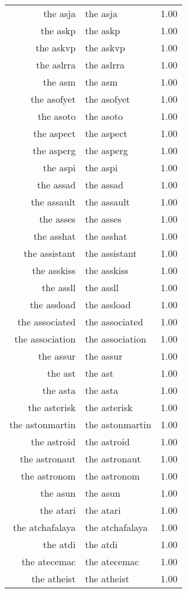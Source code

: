 \begin{table}[ht]
\begin{tabular}{rlr}
  the asja & the asja & 1.00 \\ 
  the askp & the askp & 1.00 \\ 
  the askvp & the askvp & 1.00 \\ 
  the aslrra & the aslrra & 1.00 \\ 
  the asm & the asm & 1.00 \\ 
  the asofyet & the asofyet & 1.00 \\ 
  the asoto & the asoto & 1.00 \\ 
  the aspect & the aspect & 1.00 \\ 
  the asperg & the asperg & 1.00 \\ 
  the aspi & the aspi & 1.00 \\ 
  the assad & the assad & 1.00 \\ 
  the assault & the assault & 1.00 \\ 
  the asses & the asses & 1.00 \\ 
  the asshat & the asshat & 1.00 \\ 
  the assistant & the assistant & 1.00 \\ 
  the asskiss & the asskiss & 1.00 \\ 
  the assll & the assll & 1.00 \\ 
  the assload & the assload & 1.00 \\ 
  the associated & the associated & 1.00 \\ 
  the association & the association & 1.00 \\ 
  the assur & the assur & 1.00 \\ 
  the ast & the ast & 1.00 \\ 
  the asta & the asta & 1.00 \\ 
  the asterisk & the asterisk & 1.00 \\ 
  the astonmartin & the astonmartin & 1.00 \\ 
  the astroid & the astroid & 1.00 \\ 
  the astronaut & the astronaut & 1.00 \\ 
  the astronom & the astronom & 1.00 \\ 
  the asun & the asun & 1.00 \\ 
  the atari & the atari & 1.00 \\ 
  the atchafalaya & the atchafalaya & 1.00 \\ 
  the atdi & the atdi & 1.00 \\ 
  the atecemac & the atecemac & 1.00 \\ 
  the atheist & the atheist & 1.00 \\ 

\end{tabular}
\end{table}
